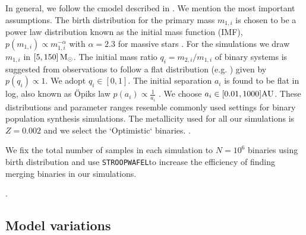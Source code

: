 \documentclass[a4paper,fleqn,usenatbib,useAMS,usedcolumn]{mnras}
\newcommand{\AISs}{\texttt{STROOPWAFEL}}%
\begin{document}
In general, we follow the cmodel described in \citet{vigna2018formation}. We mention the most important assumptions. 
The birth distribution for the primary mass $m_{1,i}$ is chosen to be a power law distribution known as the initial mass function (IMF), $p(m_{1,i}) \propto  m_{1,i}^{-\alpha}$ with $\alpha = 2.3$ for massive stars \citep{kroupa2001variation}. For the simulations we draw $m_{1,i} $ in $[5,150] \, \rm{M}_{\odot}$. 
The initial mass ratio $q_i = m_{2,i} / m_{1,i} $ of binary systems is suggested from observations to follow a flat distribution (e.g. \citealt{tout1991relation,mazeh1992mass, goldberg1994mass, sana2012binary}) given by $p(q_i) \propto  1$. We adopt $q_i \in [0,1]$. 
The initial separation $a_i$ is found to be flat in log, also known as \"{O}piks law  $p(a_i) \propto \frac{1 }{a_i}$ \citep{opik1924statistical, 1983ARA&A..21..343A}. We choose $a_i \in [0.01, 1000] \rm{AU}$.  
These distributions and parameter ranges resemble commonly used settings for binary population synthesis simulations. The metallicity used for all our simulations is $Z = 0.002$ and we select the `Optimistic` binaries. . 

We fix the total number of samples in each simulation to $N =  10^6$ binaries using birth distribution and use   \AISs to increase the efficiency of finding merging binaries in our simulations. 

. 






\subsection{Model variations}
\end{document}
